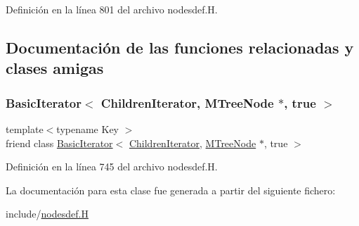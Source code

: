 Definición en la línea 801 del archivo nodesdef.\+H.



\subsection{Documentación de las funciones relacionadas y clases amigas}
\mbox{\label{class_designar_1_1_m_tree_node_1_1_children_iterator_a9318ecb15aa59102557883ca0b98fea5}} 
\subsubsection{\texorpdfstring{Basic\+Iterator$<$ Children\+Iterator, M\+Tree\+Node $\ast$, true $>$}{BasicIterator< ChildrenIterator, MTreeNode *, true >}}
{\footnotesize\ttfamily template$<$typename Key $>$ \\
friend class \hyperlink{class_designar_1_1_basic_iterator}{Basic\+Iterator}$<$ \hyperlink{class_designar_1_1_m_tree_node_1_1_children_iterator}{Children\+Iterator}, \hyperlink{class_designar_1_1_m_tree_node}{M\+Tree\+Node} $\ast$, true $>$\hspace{0.3cm}{\ttfamily [friend]}}



Definición en la línea 745 del archivo nodesdef.\+H.



La documentación para esta clase fue generada a partir del siguiente fichero\+:\begin{DoxyCompactItemize}
\item 
include/\hyperlink{nodesdef_8_h}{nodesdef.\+H}\end{DoxyCompactItemize}

